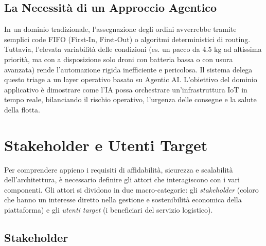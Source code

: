 \subsection*{La Necessità di un Approccio Agentico}

In un dominio tradizionale, l'assegnazione degli ordini avverrebbe tramite semplici code FIFO (First-In, First-Out) o algoritmi deterministici di routing. %
Tuttavia, l'elevata variabilità delle condizioni (es. un pacco da 4.5 kg ad altissima priorità, ma con a disposizione solo droni con batteria bassa o con usura avanzata) rende l'automazione rigida inefficiente e pericolosa. %
Il sistema delega questo triage a un layer operativo basato su Agentic AI. %
L'obiettivo del dominio applicativo è dimostrare come l'IA possa orchestrare un'infrastruttura IoT in tempo reale, bilanciando il rischio operativo, l'urgenza delle consegne e la salute della flotta. %

\section{Stakeholder e Utenti Target}
\label{sec:stakeholder_utenti}

Per comprendere appieno i requisiti di affidabilità, sicurezza e scalabilità dell'architettura, è necessario definire gli attori che interagiscono con i vari componenti. %
Gli attori si dividono in due macro-categorie: gli \textit{stakeholder} (coloro che hanno un interesse diretto nella gestione e sostenibilità economica della piattaforma) e gli \textit{utenti target} (i beneficiari del servizio logistico). %

\subsection*{Stakeholder}

